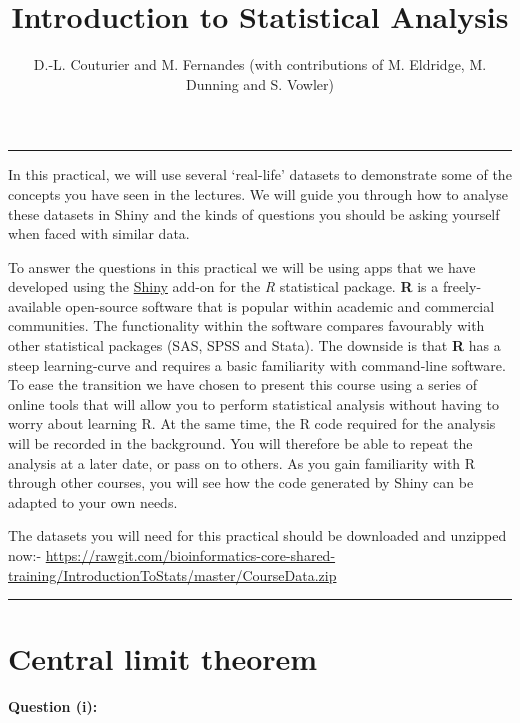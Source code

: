 \documentclass[]{article}
\title{Introduction to Statistical Analysis}
\author{D.-L. Couturier and M. Fernandes (with contributions of M. Eldridge, M.
Dunning and S. Vowler)}
\date{}
\begin{document}
\maketitle

{
\setcounter{tocdepth}{3}
\tableofcontents
}
\begin{center}\rule{0.5\linewidth}{\linethickness}\end{center}

In this practical, we will use several `real-life' datasets to
demonstrate some of the concepts you have seen in the lectures. We will
guide you through how to analyse these datasets in Shiny and the kinds
of questions you should be asking yourself when faced with similar data.

To answer the questions in this practical we will be using apps that we
have developed using the \href{http://shiny.rstudio.com/gallery/}{Shiny}
add-on for the \emph{R} statistical package. \textbf{R} is a
freely-available open-source software that is popular within academic
and commercial communities. The functionality within the software
compares favourably with other statistical packages (SAS, SPSS and
Stata). The downside is that \textbf{R} has a steep learning-curve and
requires a basic familiarity with command-line software. To ease the
transition we have chosen to present this course using a series of
online tools that will allow you to perform statistical analysis without
having to worry about learning R. At the same time, the R code required
for the analysis will be recorded in the background. You will therefore
be able to repeat the analysis at a later date, or pass on to others. As
you gain familiarity with R through other courses, you will see how the
code generated by Shiny can be adapted to your own needs.

The datasets you will need for this practical should be downloaded and
unzipped now:-
\url{https://rawgit.com/bioinformatics-core-shared-training/IntroductionToStats/master/CourseData.zip}

\begin{center}\rule{0.5\linewidth}{\linethickness}\end{center}

\hypertarget{central-limit-theorem}{%
\section{Central limit theorem}\label{central-limit-theorem}}

{\textbf{Question (i):}}
\end{document}
